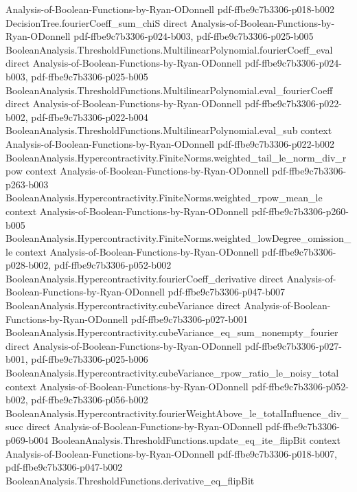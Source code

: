 \begin{theorem}
  {Analysis-of-Boolean-Functions-by-Ryan-ODonnell}
  {pdf-ffbe9c7b3306-p018-b002}
\proofstep
  {DecisionTree.fourierCoeff_sum_chiS}
  {direct}
  {Analysis-of-Boolean-Functions-by-Ryan-ODonnell}
  {pdf-ffbe9c7b3306-p024-b003,
    pdf-ffbe9c7b3306-p025-b005}
\proofstep
  {BooleanAnalysis.ThresholdFunctions.MultilinearPolynomial.fourierCoeff_eval}
  {direct}
  {Analysis-of-Boolean-Functions-by-Ryan-ODonnell}
  {pdf-ffbe9c7b3306-p024-b003,
    pdf-ffbe9c7b3306-p025-b005}
\proofstep
  {BooleanAnalysis.ThresholdFunctions.MultilinearPolynomial.eval_fourierCoeff}
  {direct}
  {Analysis-of-Boolean-Functions-by-Ryan-ODonnell}
  {pdf-ffbe9c7b3306-p022-b002,
    pdf-ffbe9c7b3306-p022-b004}
\proofstep
  {BooleanAnalysis.ThresholdFunctions.MultilinearPolynomial.eval_sub}
  {context}
  {Analysis-of-Boolean-Functions-by-Ryan-ODonnell}
  {pdf-ffbe9c7b3306-p022-b002}
\proofstep
  {BooleanAnalysis.Hypercontractivity.FiniteNorms.weighted_tail_le_norm_div_rpow}
  {context}
  {Analysis-of-Boolean-Functions-by-Ryan-ODonnell}
  {pdf-ffbe9c7b3306-p263-b003}
\proofstep
  {BooleanAnalysis.Hypercontractivity.FiniteNorms.weighted_rpow_mean_le}
  {context}
  {Analysis-of-Boolean-Functions-by-Ryan-ODonnell}
  {pdf-ffbe9c7b3306-p260-b005}
\proofstep
  {BooleanAnalysis.Hypercontractivity.FiniteNorms.weighted_lowDegree_omission_le}
  {context}
  {Analysis-of-Boolean-Functions-by-Ryan-ODonnell}
  {pdf-ffbe9c7b3306-p028-b002,
    pdf-ffbe9c7b3306-p052-b002}
\proofstep
  {BooleanAnalysis.Hypercontractivity.fourierCoeff_derivative}
  {direct}
  {Analysis-of-Boolean-Functions-by-Ryan-ODonnell}
  {pdf-ffbe9c7b3306-p047-b007}
\proofstep
  {BooleanAnalysis.Hypercontractivity.cubeVariance}
  {direct}
  {Analysis-of-Boolean-Functions-by-Ryan-ODonnell}
  {pdf-ffbe9c7b3306-p027-b001}
\proofstep
  {BooleanAnalysis.Hypercontractivity.cubeVariance_eq_sum_nonempty_fourier}
  {direct}
  {Analysis-of-Boolean-Functions-by-Ryan-ODonnell}
  {pdf-ffbe9c7b3306-p027-b001,
    pdf-ffbe9c7b3306-p025-b006}
\proofstep
  {BooleanAnalysis.Hypercontractivity.cubeVariance_rpow_ratio_le_noisy_total}
  {context}
  {Analysis-of-Boolean-Functions-by-Ryan-ODonnell}
  {pdf-ffbe9c7b3306-p052-b002,
    pdf-ffbe9c7b3306-p056-b002}
\proofstep
  {BooleanAnalysis.Hypercontractivity.fourierWeightAbove_le_totalInfluence_div_succ}
  {direct}
  {Analysis-of-Boolean-Functions-by-Ryan-ODonnell}
  {pdf-ffbe9c7b3306-p069-b004}
\proofstep
  {BooleanAnalysis.ThresholdFunctions.update_eq_ite_flipBit}
  {context}
  {Analysis-of-Boolean-Functions-by-Ryan-ODonnell}
  {pdf-ffbe9c7b3306-p018-b007,
    pdf-ffbe9c7b3306-p047-b002}
\proofstep
  {BooleanAnalysis.ThresholdFunctions.derivative_eq_flipBit}

\end{theorem}
